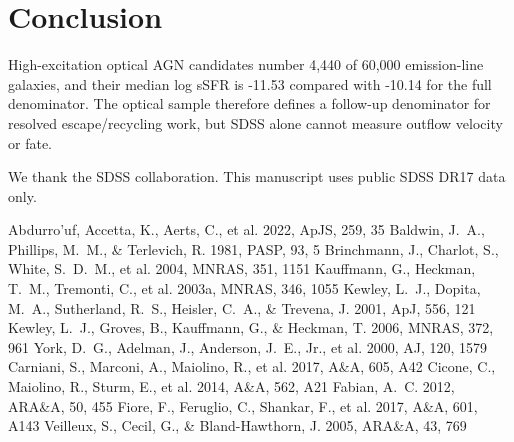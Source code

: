 \documentclass[twocolumn]{aastex631}
\begin{document}
\section{Conclusion}\label{sec:conclusion}
High-excitation optical AGN candidates number 4,440 of 60,000 emission-line galaxies, and their median log sSFR is -11.53 compared with -10.14 for the full denominator. The optical sample therefore defines a follow-up denominator for resolved escape/recycling work, but SDSS alone cannot measure outflow velocity or fate.

\acknowledgments
We thank the SDSS collaboration. This manuscript uses public SDSS DR17 data only.


\begin{thebibliography}{}
 Abdurro'uf, Accetta, K., Aerts, C., et al. 2022, ApJS, 259, 35
 Baldwin, J.~A., Phillips, M.~M., \& Terlevich, R. 1981, PASP, 93, 5
 Brinchmann, J., Charlot, S., White, S.~D.~M., et al. 2004, MNRAS, 351, 1151
 Kauffmann, G., Heckman, T.~M., Tremonti, C., et al. 2003a, MNRAS, 346, 1055
 Kewley, L.~J., Dopita, M.~A., Sutherland, R.~S., Heisler, C.~A., \& Trevena, J. 2001, ApJ, 556, 121
 Kewley, L.~J., Groves, B., Kauffmann, G., \& Heckman, T. 2006, MNRAS, 372, 961
 York, D.~G., Adelman, J., Anderson, J.~E., Jr., et al. 2000, AJ, 120, 1579
 Carniani, S., Marconi, A., Maiolino, R., et al. 2017, A\&A, 605, A42
 Cicone, C., Maiolino, R., Sturm, E., et al. 2014, A\&A, 562, A21
 Fabian, A.~C. 2012, ARA\&A, 50, 455
 Fiore, F., Feruglio, C., Shankar, F., et al. 2017, A\&A, 601, A143
 Veilleux, S., Cecil, G., \& Bland-Hawthorn, J. 2005, ARA\&A, 43, 769
\end{thebibliography}
\end{document}
